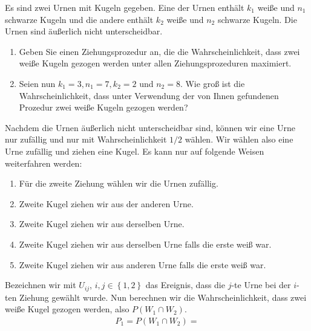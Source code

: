  Es
sind zwei Urnen mit Kugeln gegeben. Eine der Urnen enthält $k_1$ weiße und
$n_1$ schwarze Kugeln und die andere enthält $k_2$ weiße und $n_2$ schwarze
Kugeln. Die Urnen sind äußerlich nicht unterscheidbar.
\begin{enumerate}
    \item Geben Sie einen Ziehungsprozedur an, die die Wahrscheinlichkeit, dass
        zwei weiße Kugeln gezogen werden unter allen Ziehungsprozeduren maximiert.

    \item Seien nun $k_1=3, n_1=7, k_2=2$ und $n_2=8$. Wie groß ist die
        Wahrscheinlichkeit, dass unter Verwendung der von Ihnen gefundenen
        Prozedur zwei weiße Kugeln gezogen werden?
\end{enumerate}

\solution
Nachdem die Urnen äußerlich nicht unterscheidbar sind, können wir eine
Urne nur zufällig und nur mit Wahrscheinlichkeit $1/2$ wählen. Wir wählen 
also eine Urne zufällig und ziehen eine Kugel. Es kann nur auf folgende Weisen
weiterfahren werden:

\begin{enumerate}
    \item Für die zweite Ziehung wählen wir die Urnen zufällig.
    \item Zweite Kugel ziehen wir aus der anderen Urne. 
    \item Zweite Kugel ziehen wir aus derselben Urne.
    \item Zweite Kugel ziehen wir aus derselben Urne falls die erste weiß war.
    \item Zweite Kugel ziehen wir aus anderen Urne falls die erste weiß war.
\end{enumerate}
Bezeichnen wir mit $U_{ij}$, $i,j\in \left\{ 1,2 \right\}$ das Ereignis, dass
die $j$-te Urne bei der $i$-ten Ziehung gewählt wurde. Nun berechnen wir die 
Wahrscheinlichkeit, dass zwei weiße Kugel gezogen werden, also $P(W_1 \cap W_2)$.
\begin{align*}
    P_1 = P(W_1 \cap W_2) = 
\end{align*}


